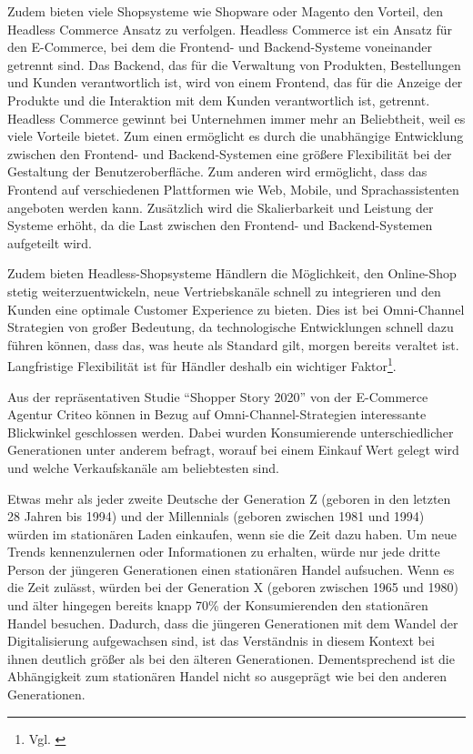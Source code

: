 Zudem bieten viele Shopsysteme wie Shopware oder Magento den Vorteil, den Headless Commerce Ansatz zu verfolgen. Headless Commerce ist ein Ansatz für den E-Commerce, bei dem die Frontend- und Backend-Systeme voneinander getrennt sind. Das Backend, das für die Verwaltung von Produkten, Bestellungen und Kunden verantwortlich ist, wird von einem Frontend, das für die Anzeige der Produkte und die Interaktion mit dem Kunden verantwortlich ist, getrennt. Headless Commerce gewinnt bei Unternehmen immer mehr an Beliebtheit, weil es viele Vorteile bietet. Zum einen ermöglicht es durch die unabhängige Entwicklung zwischen den Frontend- und Backend-Systemen eine größere Flexibilität bei der Gestaltung der Benutzeroberfläche. Zum anderen wird ermöglicht, dass das Frontend auf verschiedenen Plattformen wie Web, Mobile, und Sprachassistenten angeboten werden kann. Zusätzlich wird die Skalierbarkeit und Leistung der Systeme erhöht, da die Last zwischen den Frontend- und Backend-Systemen aufgeteilt wird.
\newline

Zudem bieten Headless-Shopsysteme Händlern die Möglichkeit, den Online-Shop stetig weiterzuentwickeln, neue Vertriebskanäle schnell zu integrieren und den Kunden eine optimale Customer Experience zu bieten. Dies ist bei Omni-Channel Strategien von großer Bedeutung, da technologische Entwicklungen schnell dazu führen können, dass das, was heute als Standard gilt, morgen bereits veraltet ist. Langfristige Flexibilität ist für Händler deshalb ein wichtiger Faktor\footnote{Vgl. \autocite [S. 89] {Boeckenholt2018}}.
\newline

Aus der repräsentativen Studie “Shopper Story 2020” von der E-Commerce Agentur Criteo können in Bezug auf Omni-Channel-Strategien interessante Blickwinkel geschlossen werden. Dabei wurden Konsumierende unterschiedlicher Generationen unter anderem befragt, worauf bei einem Einkauf Wert gelegt wird und welche Verkaufskanäle am beliebtesten sind.
\newline

Etwas mehr als jeder zweite Deutsche der Generation Z (geboren in den letzten 28 Jahren bis 1994) und der Millennials (geboren zwischen 1981 und 1994) würden im stationären Laden einkaufen, wenn sie die Zeit dazu haben. Um neue Trends kennenzulernen oder Informationen zu erhalten, würde nur jede dritte Person der jüngeren Generationen einen stationären Handel aufsuchen. Wenn es die Zeit zulässt, würden bei der Generation X (geboren zwischen 1965 und 1980) und älter hingegen bereits knapp 70\% der Konsumierenden den stationären Handel besuchen. Dadurch, dass die jüngeren Generationen mit dem Wandel der Digitalisierung aufgewachsen sind, ist das Verständnis in diesem Kontext bei ihnen deutlich größer als bei den älteren Generationen. Dementsprechend ist die Abhängigkeit zum stationären Handel nicht so ausgeprägt wie bei den anderen Generationen.
\newline

